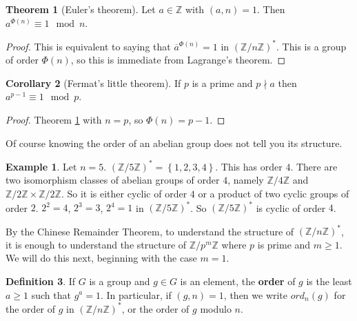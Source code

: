 \documentclass{article}
\newcommand{\Z}{\mathbb{Z}}
\newcommand{\rb}[1]{\left( #1 \right)}
\newcommand{\cb}[1]{\left\{ #1 \right\}}
\theoremstyle{definition}\newtheorem{definition}{Definition}
\theoremstyle{definition}\newtheorem*{remark}{Remark}
\theoremstyle{definition}\newtheorem*{example}{Example}
\theoremstyle{definition}\newtheorem*{note}{Note}
\newtheorem{theorem}[definition]{Theorem}
\newtheorem{corollary}[definition]{Corollary}
\begin{document}
\begin{theorem}[Euler's theorem]
\label{thm:16}
Let $ a \in \Z $ with $ \rb{a, n} = 1 $. Then $ a^{\Phi\rb{n}} \equiv 1 \mod n $.
\end{theorem}

\begin{proof}
This is equivalent to saying that $ \overline{a}^{\Phi\rb{n}} = 1 $ in $ \rb{\Z / n\Z}^* $. This is a group of order $ \Phi\rb{n} $, so this is immediate from Lagrange's theorem.
\end{proof}

\begin{corollary}[Fermat's little theorem]
If $ p $ is a prime and $ p \nmid a $ then $ a^{p - 1} \equiv 1 \mod p $.
\end{corollary}

\begin{proof}
Theorem \ref{thm:16} with $ n = p $, so $ \Phi\rb{n} = p - 1 $.
\end{proof}

Of course knowing the order of an abelian group does not tell you its structure.

\begin{example}
Let $ n = 5 $. $ \rb{\Z / 5\Z}^* = \cb{1, 2, 3, 4} $. This has order $ 4 $. There are two isomorphism classes of abelian groups of order $ 4 $, namely $ \Z / 4\Z $ and $ \Z / 2\Z \times \Z / 2\Z $. So it is either cyclic of order $ 4 $ or a product of two cyclic groups of order $ 2 $. $ 2^2 = 4 $, $ 2^3 = 3 $, $ 2^4 = 1 $ in $ \rb{\Z / 5\Z}^* $. So $ \rb{\Z / 5\Z}^* $ is cyclic of order $ 4 $.
\end{example}

By the Chinese Remainder Theorem, to understand the structure of $ \rb{\Z / n\Z}^* $, it is enough to understand the structure of $ \Z / p^m\Z $ where $ p $ is prime and $ m \ge 1 $. We will do this next, beginning with the case $ m = 1 $.


\begin{definition}
If $ G $ is a group and $ g \in G $ is an element, the \textbf{order} of $ g $ is the least $ a \ge 1 $ such that $ g^a = 1 $. In particular, if $ \rb{g, n} = 1 $, then we write $ ord_n\rb{g} $ for the order of $ g $ in $ \rb{\Z / n\Z}^* $, or the order of $ g $ modulo $ n $.
\end{definition}
\end{document}
